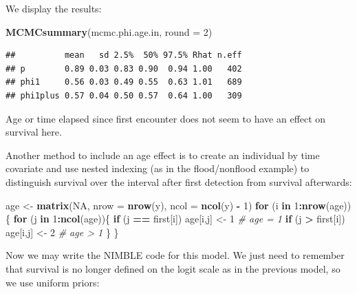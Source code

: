 \documentclass[
  12pt,
]{krantz}
\newenvironment{Shaded}{\begin{snugshade}}{\end{snugshade}}
\newcommand{\AttributeTok}[1]{\textcolor[rgb]{0.13,0.29,0.53}{#1}}
\newcommand{\CommentTok}[1]{\textcolor[rgb]{0.56,0.35,0.01}{\textit{#1}}}
\newcommand{\ConstantTok}[1]{\textcolor[rgb]{0.56,0.35,0.01}{#1}}
\newcommand{\ControlFlowTok}[1]{\textcolor[rgb]{0.13,0.29,0.53}{\textbf{#1}}}
\newcommand{\DecValTok}[1]{\textcolor[rgb]{0.00,0.00,0.81}{#1}}
\newcommand{\FunctionTok}[1]{\textcolor[rgb]{0.13,0.29,0.53}{\textbf{#1}}}
\newcommand{\NormalTok}[1]{#1}
\newcommand{\OtherTok}[1]{\textcolor[rgb]{0.56,0.35,0.01}{#1}}
\newcommand{\SpecialCharTok}[1]{\textcolor[rgb]{0.81,0.36,0.00}{\textbf{#1}}}
\begin{document}
We display the results:

\begin{Shaded}
\begin{Highlighting}[]
\FunctionTok{MCMCsummary}\NormalTok{(mcmc.phi.age.in, }\AttributeTok{round =} \DecValTok{2}\NormalTok{)}
\end{Highlighting}
\end{Shaded}

\begin{verbatim}
##          mean   sd 2.5%  50% 97.5% Rhat n.eff
## p        0.89 0.03 0.83 0.90  0.94 1.00   402
## phi1     0.56 0.03 0.49 0.55  0.63 1.01   689
## phi1plus 0.57 0.04 0.50 0.57  0.64 1.00   309
\end{verbatim}

Age or time elapsed since first encounter does not seem to have an effect on survival here.

Another method to include an age effect is to create an individual by time covariate and use nested indexing (as in the flood/nonflood example) to distinguish survival over the interval after first detection from survival afterwards:

\begin{Shaded}
\begin{Highlighting}[]
\NormalTok{age }\OtherTok{\textless{}{-}} \FunctionTok{matrix}\NormalTok{(}\ConstantTok{NA}\NormalTok{, }\AttributeTok{nrow =} \FunctionTok{nrow}\NormalTok{(y), }\AttributeTok{ncol =} \FunctionTok{ncol}\NormalTok{(y) }\SpecialCharTok{{-}} \DecValTok{1}\NormalTok{)}
\ControlFlowTok{for}\NormalTok{ (i }\ControlFlowTok{in} \DecValTok{1}\SpecialCharTok{:}\FunctionTok{nrow}\NormalTok{(age))\{}
  \ControlFlowTok{for}\NormalTok{ (j }\ControlFlowTok{in} \DecValTok{1}\SpecialCharTok{:}\FunctionTok{ncol}\NormalTok{(age))\{}
    \ControlFlowTok{if}\NormalTok{ (j }\SpecialCharTok{==}\NormalTok{ first[i]) age[i,j] }\OtherTok{\textless{}{-}} \DecValTok{1} \CommentTok{\# age = 1}
    \ControlFlowTok{if}\NormalTok{ (j }\SpecialCharTok{\textgreater{}}\NormalTok{ first[i]) age[i,j] }\OtherTok{\textless{}{-}} \DecValTok{2}  \CommentTok{\# age \textgreater{} 1}
\NormalTok{  \}}
\NormalTok{\}}
\end{Highlighting}
\end{Shaded}

Now we may write the NIMBLE code for this model. We just need to remember that survival is no longer defined on the logit scale as in the previous model, so we use uniform priors:
\end{document}
